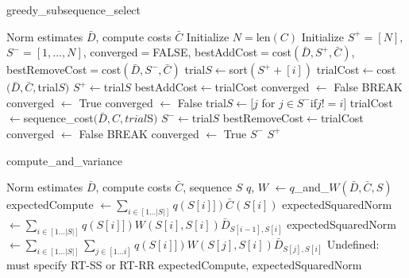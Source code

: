 \begin{algorithm}[H]
   \caption{greedy\_subsequence\_select}
   \label{alg:greedy}
\begin{algorithmic}
    Norm estimates $\bar{D}$, compute costs $\bar{C}$
   \STATE Initialize $N = \text{len}(C)$
   \STATE Initialize $S^+ = [N]$, $S^{-} = [1, ..., N]$,
   converged$ = $FALSE, bestAddCost$ = $cost$(\bar{D}, S^+, \bar{C})$,
   bestRemoveCost$ = $cost$(\bar{D}, S^-, \bar{C})$
   \STATE
   \STATE trial$S \leftarrow $sort$(S^+ + [i])$
   \STATE trialCost$ \leftarrow $cost$(\bar{D}, \bar{C}, $trial$S)$
   \STATE $S^+ \leftarrow $trial$S$
   \STATE bestAddCost$ \leftarrow $trialCost
   \STATE converged $\leftarrow$ False
   \STATE BREAK
   \ELSE
   \STATE converged $\leftarrow$ True
   \ENDIF
   \ENDFOR
   \ENDWHILE
   \STATE converged $\leftarrow$ False
   \FOR{$i \in [i $ for $ i \in S^- $ if$ i \neq N$}
   \STATE trial$S \leftarrow [j $ for $ j \in S^- $if$ j != i]$
   \STATE trialCost$ \leftarrow $sequence\_cost$(\bar{D}, C, trial$S$)$
   \STATE $S^- \leftarrow $trial$S$
   \STATE bestRemoveCost$ \leftarrow $trialCost
   \STATE converged $\leftarrow$ False
   \STATE BREAK
   \ELSE
   \STATE converged $\leftarrow$ True
   \ENDIF
   \ENDFOR
   \ENDWHILE
    $S^-$
   \ELSE
    $S^+$
   \ENDIF
\end{algorithmic}
\end{algorithm}

\begin{algorithm}[H]
   \caption{compute\_and\_variance}
   \label{alg:cv}
\begin{algorithmic}
    Norm estimates $\bar{D}$, compute costs $\bar{C}$, sequence $S$
   \STATE $q$, $W$ $\leftarrow q$\_and\_$W(\bar{D}, \bar{C}, S)$
   \STATE expectedCompute $\leftarrow \sum_{i \in [1 ... |S|]} q(S[i]]) \bar{C}(S[i])$
   \STATE expectedSquaredNorm $\leftarrow \sum_{i \in [1 ... |S|]} q(S[i]]) W(S[i], S[i]) \bar{D}_{S[i-1], S[i]}$
   \STATE expectedSquaredNorm $\leftarrow \sum_{i \in [1 ... |S|]} \sum_{j \in [1 ... i]} q(S[i]]) W(S[j], S[i]) \bar{D}_{S[j], S[i]}$
   \ELSE
   \STATE Undefined: must specify RT-SS or RT-RR
   \ENDIF
    expectedCompute, expectedSquaredNorm
\end{algorithmic}
\end{algorithm}

